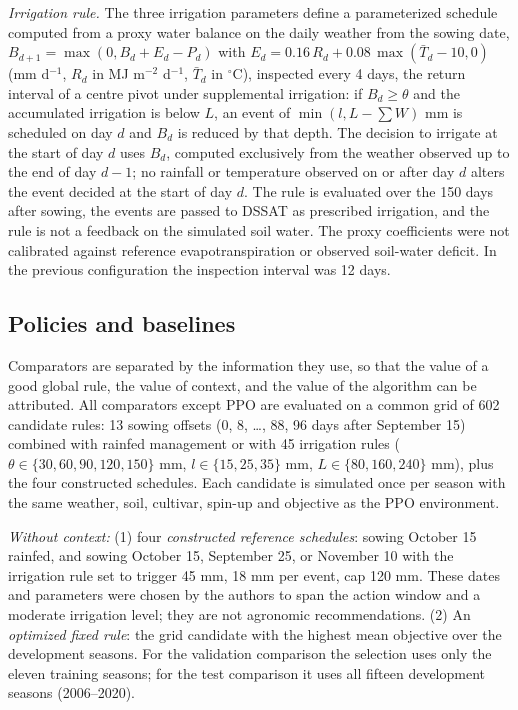 \documentclass[times,final,authoryear]{elsarticle}
\begin{document}
\emph{Irrigation rule.} The three irrigation parameters define a parameterized schedule computed from a proxy water balance on the daily weather from the sowing date, $B_{d+1} = \max(0, B_d + E_d - P_d)$ with $E_d = 0.16\,R_d + 0.08\,\max(\bar{T}_d - 10, 0)$ (mm d$^{-1}$, $R_d$ in MJ m$^{-2}$ d$^{-1}$, $\bar{T}_d$ in $^{\circ}$C), inspected every 4 days, the return interval of a centre pivot under supplemental irrigation: if $B_d \geq \theta$ and the accumulated irrigation is below $L$, an event of $\min(l, L - \sum W)$ mm is scheduled on day $d$ and $B_d$ is reduced by that depth. The decision to irrigate at the start of day $d$ uses $B_d$, computed exclusively from the weather observed up to the end of day $d-1$; no rainfall or temperature observed on or after day $d$ alters the event decided at the start of day $d$. The rule is evaluated over the 150 days after sowing, the events are passed to DSSAT as prescribed irrigation, and the rule is not a feedback on the simulated soil water. The proxy coefficients were not calibrated against reference evapotranspiration or observed soil-water deficit. In the previous configuration the inspection interval was 12 days.

\subsection{Policies and baselines}
\label{subbaselines}

Comparators are separated by the information they use, so that the value of a good global rule, the value of context, and the value of the algorithm can be attributed. All comparators except PPO are evaluated on a common grid of 602 candidate rules: 13 sowing offsets (0, 8, \dots, 88, 96 days after September 15) combined with rainfed management or with 45 irrigation rules ($\theta \in \{30, 60, 90, 120, 150\}$ mm, $l \in \{15, 25, 35\}$ mm, $L \in \{80, 160, 240\}$ mm), plus the four constructed schedules. Each candidate is simulated once per season with the same weather, soil, cultivar, spin-up and objective as the PPO environment.

\emph{Without context:} (1) four \emph{constructed reference schedules}: sowing October 15 rainfed, and sowing October 15, September 25, or November 10 with the irrigation rule set to trigger 45 mm, 18 mm per event, cap 120 mm. These dates and parameters were chosen by the authors to span the action window and a moderate irrigation level; they are not agronomic recommendations. (2) An \emph{optimized fixed rule}: the grid candidate with the highest mean objective over the development seasons. For the validation comparison the selection uses only the eleven training seasons; for the test comparison it uses all fifteen development seasons (2006--2020).
\end{document}
